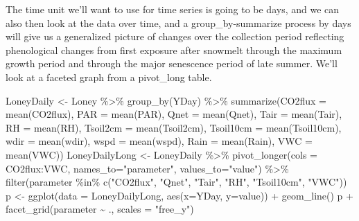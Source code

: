 \documentclass[
]{book}
\newenvironment{Shaded}{\begin{snugshade}}{\end{snugshade}}
\newcommand{\AttributeTok}[1]{\textcolor[rgb]{0.61,0.61,0.61}{#1}}
\newcommand{\FunctionTok}[1]{\textcolor[rgb]{0,0,0}{#1}}
\newcommand{\NormalTok}[1]{#1}
\newcommand{\OtherTok}[1]{\textcolor[rgb]{0.37,0.37,0.37}{#1}}
\newcommand{\SpecialCharTok}[1]{\textcolor[rgb]{0,0,0}{#1}}
\newcommand{\StringTok}[1]{\textcolor[rgb]{0.5,0.5,0.5}{#1}}
\begin{document}
The time unit we'll want to use for time series is going to be days, and we can also then look at the data over time, and a group\_by-summarize process by days will give us a generalized picture of changes over the collection period reflecting phenological changes from first exposure after snowmelt through the maximum growth period and through the major senescence period of late summer. We'll look at a faceted graph from a pivot\_long table.

\begin{Shaded}
\begin{Highlighting}[]
\NormalTok{LoneyDaily }\OtherTok{\textless{}{-}}\NormalTok{ Loney }\SpecialCharTok{\%\textgreater{}\%}
  \FunctionTok{group\_by}\NormalTok{(YDay) }\SpecialCharTok{\%\textgreater{}\%}
  \FunctionTok{summarize}\NormalTok{(}\AttributeTok{CO2flux =} \FunctionTok{mean}\NormalTok{(CO2flux),}
            \AttributeTok{PAR =} \FunctionTok{mean}\NormalTok{(PAR),}
            \AttributeTok{Qnet =} \FunctionTok{mean}\NormalTok{(Qnet),}
            \AttributeTok{Tair =} \FunctionTok{mean}\NormalTok{(Tair),}
            \AttributeTok{RH =} \FunctionTok{mean}\NormalTok{(RH),}
            \AttributeTok{Tsoil2cm =} \FunctionTok{mean}\NormalTok{(Tsoil2cm),}
            \AttributeTok{Tsoil10cm =} \FunctionTok{mean}\NormalTok{(Tsoil10cm),}
            \AttributeTok{wdir =} \FunctionTok{mean}\NormalTok{(wdir),}
            \AttributeTok{wspd =} \FunctionTok{mean}\NormalTok{(wspd),}
            \AttributeTok{Rain =} \FunctionTok{mean}\NormalTok{(Rain),}
            \AttributeTok{VWC =} \FunctionTok{mean}\NormalTok{(VWC))}
\NormalTok{LoneyDailyLong }\OtherTok{\textless{}{-}}\NormalTok{ LoneyDaily }\SpecialCharTok{\%\textgreater{}\%}
  \FunctionTok{pivot\_longer}\NormalTok{(}\AttributeTok{cols =}\NormalTok{ CO2flux}\SpecialCharTok{:}\NormalTok{VWC,}
               \AttributeTok{names\_to=}\StringTok{"parameter"}\NormalTok{,}
               \AttributeTok{values\_to=}\StringTok{"value"}\NormalTok{) }\SpecialCharTok{\%\textgreater{}\%}
  \FunctionTok{filter}\NormalTok{(parameter }\SpecialCharTok{\%in\%} \FunctionTok{c}\NormalTok{(}\StringTok{"CO2flux"}\NormalTok{, }\StringTok{"Qnet"}\NormalTok{, }\StringTok{"Tair"}\NormalTok{, }\StringTok{"RH"}\NormalTok{, }\StringTok{"Tsoil10cm"}\NormalTok{, }\StringTok{"VWC"}\NormalTok{))}
\NormalTok{p }\OtherTok{\textless{}{-}} \FunctionTok{ggplot}\NormalTok{(}\AttributeTok{data =}\NormalTok{ LoneyDailyLong, }\FunctionTok{aes}\NormalTok{(}\AttributeTok{x=}\NormalTok{YDay, }\AttributeTok{y=}\NormalTok{value)) }\SpecialCharTok{+} 
  \FunctionTok{geom\_line}\NormalTok{()}
\NormalTok{p }\SpecialCharTok{+} \FunctionTok{facet\_grid}\NormalTok{(parameter }\SpecialCharTok{\textasciitilde{}}\NormalTok{ ., }\AttributeTok{scales =} \StringTok{"free\_y"}\NormalTok{)}
\end{Highlighting}
\end{Shaded}
\end{document}
